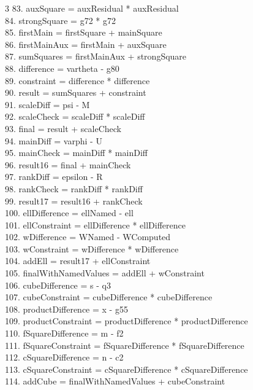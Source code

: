 \documentclass[10pt]{article}
\begin{document}
\begin{multicols}{3}
83. auxSquare = auxResidual * auxResidual\\
84. strongSquare = g72 * g72\\
85. firstMain = firstSquare + mainSquare\\
86. firstMainAux = firstMain + auxSquare\\
87. sumSquares = firstMainAux + strongSquare\\
88. difference = vartheta - g80\\
89. constraint = difference * difference\\
90. result = sumSquares + constraint\\
91. scaleDiff = psi - M\\
92. scaleCheck = scaleDiff * scaleDiff\\
93. final = result + scaleCheck\\
94. mainDiff = varphi - U\\
95. mainCheck = mainDiff * mainDiff\\
96. result16 = final + mainCheck\\
97. rankDiff = epsilon - R\\
98. rankCheck = rankDiff * rankDiff\\
99. result17 = result16 + rankCheck\\
100. ellDifference = ellNamed - ell\\
101. ellConstraint = ellDifference * ellDifference\\
102. wDifference = WNamed - WComputed\\
103. wConstraint = wDifference * wDifference\\
104. addEll = result17 + ellConstraint\\
105. finalWithNamedValues = addEll + wConstraint\\
106. cubeDifference = s - q3\\
107. cubeConstraint = cubeDifference * cubeDifference\\
108. productDifference = x - g55\\
109. productConstraint = productDifference * productDifference\\
110. fSquareDifference = m - f2\\
111. fSquareConstraint = fSquareDifference * fSquareDifference\\
112. cSquareDifference = n - c2\\
113. cSquareConstraint = cSquareDifference * cSquareDifference\\
114. addCube = finalWithNamedValues + cubeConstraint\\

\end{multicols}
\end{document}
